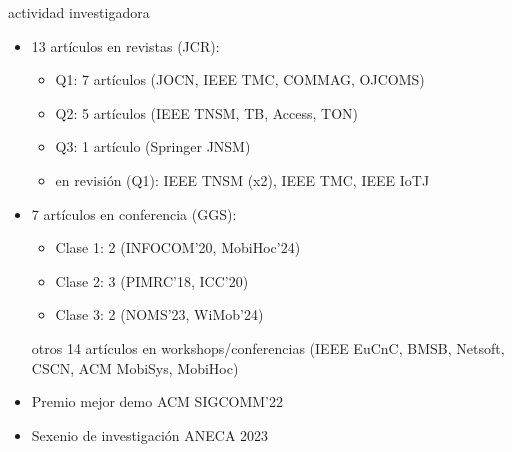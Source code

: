 \documentclass[xcolor=table,xcolor=x11names]{beamer}
\begin{document}
\begin{frame}{\secname}{actividad investigadora}
    \begin{itemize}
        \item 13 artículos en revistas (JCR):
        \begin{itemize}
            \item Q1: 7 artículos (JOCN, IEEE TMC, COMMAG, OJCOMS)
            \item Q2: 5 artículos (IEEE TNSM, TB, Access, TON)
            \item Q3: 1 artículo (Springer JNSM)
            \item en revisión (Q1): IEEE TNSM (x2), IEEE TMC, IEEE IoTJ
        \end{itemize}


        \item 7 artículos en conferencia (GGS):
        \begin{itemize}
            \item Clase 1: 2 (INFOCOM'20, MobiHoc'24)
            \item Clase 2: 3 (PIMRC'18, ICC'20)
            \item Clase 3: 2 (NOMS'23, WiMob'24)
        \end{itemize}
        otros 14 artículos en workshops/conferencias
        (IEEE EuCnC, BMSB, Netsoft, CSCN, ACM MobiSys, MobiHoc)

        \item Premio mejor demo ACM SIGCOMM'22

        \item Sexenio de investigación ANECA 2023
    \end{itemize}
\end{frame}
\end{document}
